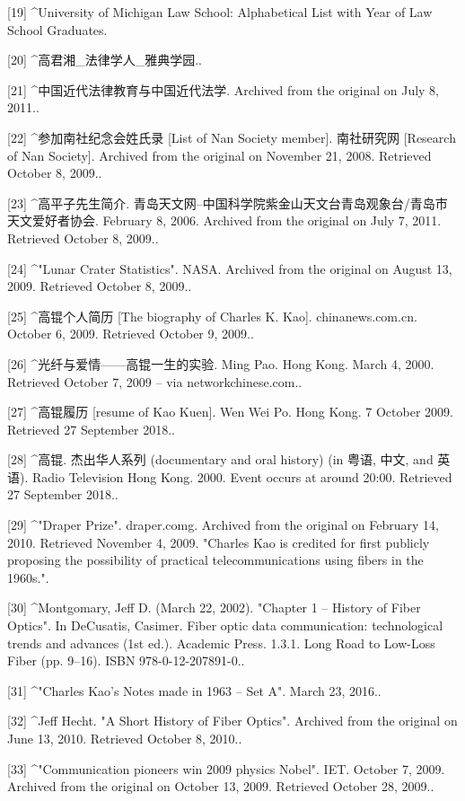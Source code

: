 [19]
^University of Michigan Law School: Alphabetical List with Year of Law School Graduates.

[20]
^高君湘_法律学人_雅典学园..

[21]
^中国近代法律教育与中国近代法学. Archived from the original on July 8, 2011..

[22]
^参加南社纪念会姓氏录 [List of Nan Society member]. 南社研究网 [Research of Nan Society]. Archived from the original on November 21, 2008. Retrieved October 8, 2009..

[23]
^高平子先生简介. 青岛天文网--中国科学院紫金山天文台青岛观象台/青岛市天文爱好者协会. February 8, 2006. Archived from the original on July 7, 2011. Retrieved October 8, 2009..

[24]
^"Lunar Crater Statistics". NASA. Archived from the original on August 13, 2009. Retrieved October 8, 2009..

[25]
^高锟个人简历 [The biography of Charles K. Kao]. chinanews.com.cn. October 6, 2009. Retrieved October 9, 2009..

[26]
^光纤与爱情——高锟一生的实验. Ming Pao. Hong Kong. March 4, 2000. Retrieved October 7, 2009 – via networkchinese.com..

[27]
^高锟履历 [resume of Kao Kuen]. Wen Wei Po. Hong Kong. 7 October 2009. Retrieved 27 September 2018..

[28]
^高锟. 杰出华人系列 (documentary and oral history) (in 粤语, 中文, and 英语). Radio Television Hong Kong. 2000. Event occurs at around 20:00. Retrieved 27 September 2018..

[29]
^"Draper Prize". draper.comg. Archived from the original on February 14, 2010. Retrieved November 4, 2009. "Charles Kao is credited for first publicly proposing the possibility of practical telecommunications using fibers in the 1960s.".

[30]
^Montgomary, Jeff D. (March 22, 2002). "Chapter 1 – History of Fiber Optics". In DeCusatis, Casimer. Fiber optic data communication: technological trends and advances (1st ed.). Academic Press. 1.3.1. Long Road to Low-Loss Fiber (pp. 9–16). ISBN 978-0-12-207891-0..

[31]
^"Charles Kao's Notes made in 1963 – Set A". March 23, 2016..

[32]
^Jeff Hecht. "A Short History of Fiber Optics". Archived from the original on June 13, 2010. Retrieved October 8, 2010..

[33]
^"Communication pioneers win 2009 physics Nobel". IET. October 7, 2009. Archived from the original on October 13, 2009. Retrieved October 28, 2009..

